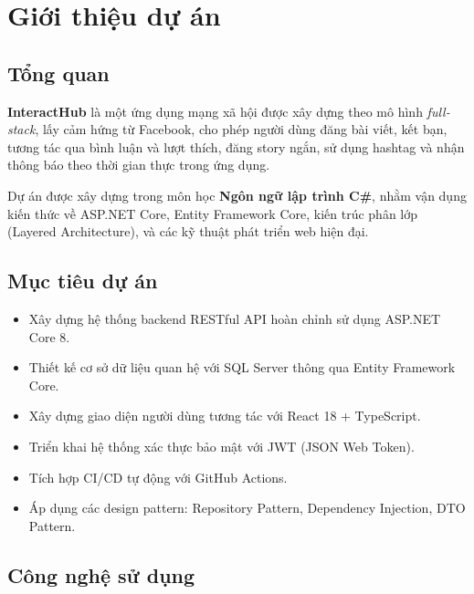 \documentclass[a4paper]{article}
\begin{document}
\thispagestyle{empty}
\newpage
\tableofcontents
\newpage

\section{Giới thiệu dự án}

\subsection{Tổng quan}

\textbf{InteractHub} là một ứng dụng mạng xã hội được xây dựng theo mô hình \textit{full-stack}, lấy cảm hứng từ Facebook, cho phép người dùng đăng bài viết, kết bạn, tương tác qua bình luận và lượt thích, đăng story ngắn, sử dụng hashtag và nhận thông báo theo thời gian thực trong ứng dụng.

Dự án được xây dựng trong môn học \textbf{Ngôn ngữ lập trình C\#}, nhằm vận dụng kiến thức về ASP.NET Core, Entity Framework Core, kiến trúc phân lớp (Layered Architecture), và các kỹ thuật phát triển web hiện đại.

\subsection{Mục tiêu dự án}

\begin{itemize}
    \item Xây dựng hệ thống backend RESTful API hoàn chỉnh sử dụng ASP.NET Core 8.
    \item Thiết kế cơ sở dữ liệu quan hệ với SQL Server thông qua Entity Framework Core.
    \item Xây dựng giao diện người dùng tương tác với React 18 + TypeScript.
    \item Triển khai hệ thống xác thực bảo mật với JWT (JSON Web Token).
    \item Tích hợp CI/CD tự động với GitHub Actions.
    \item Áp dụng các design pattern: Repository Pattern, Dependency Injection, DTO Pattern.
\end{itemize}

\subsection{Công nghệ sử dụng}
\end{document}
